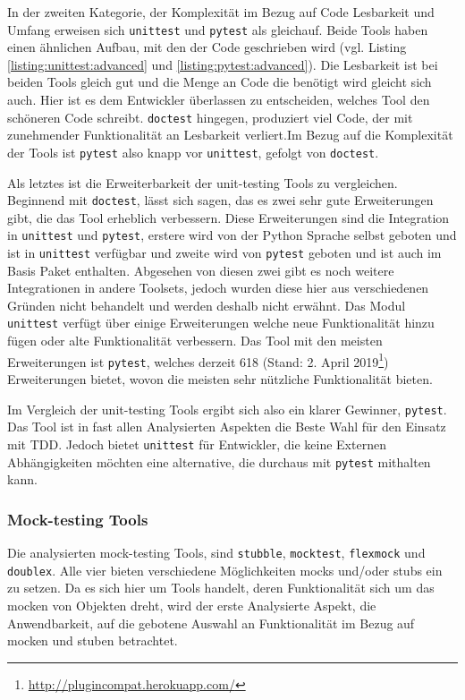 In der zweiten Kategorie, der Komplexität im Bezug auf Code Lesbarkeit und
Umfang erweisen sich \lstinline{unittest} und \lstinline{pytest} als gleichauf.
Beide Tools haben einen ähnlichen Aufbau, mit den der Code geschrieben wird
(vgl. Listing \ref{listing:unittest:advanced} und
\ref{listing:pytest:advanced}). Die Lesbarkeit ist bei beiden Tools gleich gut
und die Menge an Code die benötigt wird gleicht sich auch. Hier ist es dem
Entwickler überlassen zu entscheiden, welches Tool den schöneren Code schreibt.
\lstinline{doctest} hingegen, produziert viel Code, der mit zunehmender
Funktionalität an Lesbarkeit verliert.Im Bezug auf die Komplexität der Tools
ist \lstinline{pytest} also knapp vor \lstinline{unittest}, gefolgt von
\lstinline{doctest}.
\newline

Als letztes ist die Erweiterbarkeit der unit-testing Tools zu vergleichen.
Beginnend mit \lstinline{doctest}, lässt sich sagen, das es zwei sehr gute
Erweiterungen gibt, die das Tool erheblich verbessern. Diese Erweiterungen sind
die Integration in \lstinline{unittest} und \lstinline{pytest}, erstere wird
von der Python Sprache selbst geboten und ist in \lstinline{unittest} verfügbar
und zweite wird von \lstinline{pytest} geboten und ist auch im Basis Paket
enthalten. Abgesehen von diesen zwei gibt es noch weitere Integrationen in
andere Toolsets, jedoch wurden diese hier aus verschiedenen Gründen nicht
behandelt und werden deshalb nicht erwähnt. Das Modul \lstinline{unittest}
verfügt über einige Erweiterungen welche neue Funktionalität hinzu fügen oder
alte Funktionalität verbessern. Das Tool mit den meisten Erweiterungen ist
\lstinline{pytest}, welches derzeit 618 (Stand: 2. April
2019\footnote{\url{http://plugincompat.herokuapp.com/}}) Erweiterungen
bietet, wovon die meisten sehr nützliche Funktionalität bieten.
\newline

Im Vergleich der unit-testing Tools ergibt sich also ein klarer Gewinner,
\lstinline{pytest}. Das Tool ist in fast allen Analysierten Aspekten die Beste
Wahl für den Einsatz mit TDD. Jedoch bietet \lstinline{unittest} für
Entwickler, die keine Externen Abhängigkeiten möchten eine alternative, die
durchaus mit \lstinline{pytest} mithalten kann.

\subsubsection{Mock-testing Tools}\label{python-tools:vergleich:mock}
Die analysierten \gls{mock}-testing Tools, sind \lstinline{stubble},
\lstinline{mocktest}, \lstinline{flexmock} und \lstinline{doublex}. Alle vier
bieten verschiedene Möglichkeiten \Glspl{mock} und/oder \Glspl{stub} ein zu
setzen. Da es sich hier um Tools handelt, deren Funktionalität sich um das
\gls{mock}en von Objekten dreht, wird der erste Analysierte Aspekt, die
Anwendbarkeit, auf die gebotene Auswahl an Funktionalität im Bezug auf
\gls{mock}en und \gls{stub}en betrachtet.

